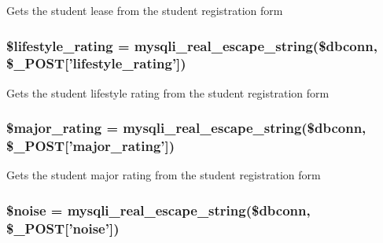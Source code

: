 \-Gets the student lease from the student registration form \hypertarget{user__view_2validate_2studentVal_8php_aeaacae1f81e4a03e1332c1e322315730}{
\subsubsection[{\$lifestyle\-\_\-rating}]{\setlength{\rightskip}{0pt plus 5cm}\$lifestyle\-\_\-rating = mysqli\-\_\-real\-\_\-escape\-\_\-string(\$dbconn, \$\-\_\-\-P\-O\-S\-T\mbox{[}'lifestyle\-\_\-rating'\mbox{]})}}\label{user__view_2validate_2studentVal_8php_aeaacae1f81e4a03e1332c1e322315730}
\-Gets the student lifestyle rating from the student registration form \hypertarget{user__view_2validate_2studentVal_8php_a658e327f04cd3d91c4a064f7f496ccef}{
\subsubsection[{\$major\-\_\-rating}]{\setlength{\rightskip}{0pt plus 5cm}\$major\-\_\-rating = mysqli\-\_\-real\-\_\-escape\-\_\-string(\$dbconn, \$\-\_\-\-P\-O\-S\-T\mbox{[}'major\-\_\-rating'\mbox{]})}}\label{user__view_2validate_2studentVal_8php_a658e327f04cd3d91c4a064f7f496ccef}
\-Gets the student major rating from the student registration form \hypertarget{user__view_2validate_2studentVal_8php_a2774f17621ab4d3b64411f86c88df407}{
\subsubsection[{\$noise}]{\setlength{\rightskip}{0pt plus 5cm}\$noise = mysqli\-\_\-real\-\_\-escape\-\_\-string(\$dbconn, \$\-\_\-\-P\-O\-S\-T\mbox{[}'noise'\mbox{]})}}\label{user__view_2validate_2studentVal_8php_a2774f17621ab4d3b64411f86c88df407}
